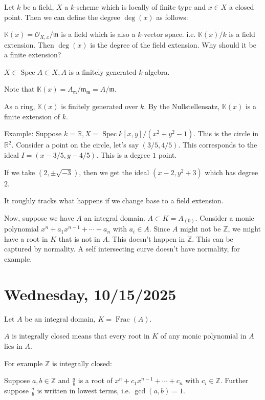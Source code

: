 \documentclass{article}
\theoremstyle{definition}
\begin{document}
    Let \(k\) be a field, \(X\) a \(k\)-scheme which is locally of finite type and \(x\in X\) a closed point. Then we can define the degree \(\deg(x)\) as follows:

    \(\mathbb{K} (x) = \mathcal{O}_{X,x} / \mathfrak{m}\) is a field which is also a \(k\)-vector space. i.e. \(\mathbb{K} (x) / k\) is a field extension. Then \(\deg(x)\) is the degree of the field extension. Why should it be a finite extension?
    
    \(X\in \operatorname{Spec} A \subset X, A\) is a finitely generated \(k\)-algebra.

    Note that \(\mathbb{K} (x) = A_{\mathfrak{m}} / \mathfrak{m}_{\mathfrak{m}} = A / \mathfrak{m}\).

    As a ring, \(\mathbb{K} (x)\) is finitely generated over \(k\). By the Nullstellensatz, \(\mathbb{K} (x)\) is a finite extension of \(k\).

    Example: Suppose \(k=\mathbb{R}, X = \operatorname{Spec} k[x,y] / (x^2 + y^2 - 1)\). This is the circle in \(\mathbb{R}^2\). Consider a point on the circle, let's say \((3 / 5, 4 / 5)\). This corresponds to the ideal \(I = (x - 3 / 5, y - 4 / 5)\). This is a degree \(1\) point.

    If we take \((2, \pm \sqrt{-3})\), then we get the ideal \((x-2, y^2 + 3)\) which has degree \(2\).
    
    It roughly tracks what happens if we change base to a field extension.

    Now, suppose we have \(A\) an integral domain. \(A \subset K = A_{(0)}\). Consider a monic polynomial \(x^n + a_1 x^{n-1} + \cdots + a_n\) with \(a_i \in A\). Since \(A\) might not be \(\mathbb{Z}\), we might have a root in \(K\) that is not in \(A\). This doesn't happen in \(\mathbb{Z}\). This can be captured by normality. A self intersecting curve doesn't have normality, for example.

    \section*{Wednesday, 10/15/2025}
    
    Let \(A\) be an integral domain, \(K = \operatorname{Frac} (A)\).

    \(A\) is integrally closed means that every root in \(K\) of any monic polynomial in \(A\) lies in \(A\).

    For example \(\mathbb{Z}\) is integrally closed:

    Suppose \(a,b\in \mathbb{Z} \) and \(\frac{a}{b}\) is a root of \(x^n + c_1 x^{n-1} + \cdots + c_n\) with \(c_i\in \mathbb{Z}\). Further suppose \(\frac{a}{b}\) is written in lowest terms, i.e. \(\gcd(a,b)=1\).
\end{document}
